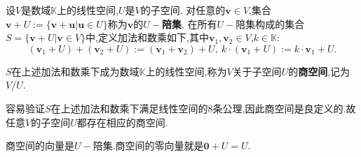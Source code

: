 \documentclass[../../main.tex]{subfiles}%
\begin{document}
\begin{definition}[$U-$陪集与商空间]\label{definition:U-陪集与商空间}
设\(V\)是数域\(\mathbb{K}\)上的线性空间,\(U\)是\(V\)的子空间. 对任意的\(\boldsymbol{v}\in V\),集合\(\boldsymbol{v}+U:=\{\boldsymbol{v}+\boldsymbol{u}|\boldsymbol{u}\in U\}\)称为\(\boldsymbol{v}\)的\textbf{\(U -\)陪集}. 在所有\(U -\)陪集构成的集合\(S = \{\boldsymbol{v}+U|\boldsymbol{v}\in V\}\)中,定义加法和数乘如下,其中\(\boldsymbol{v}_1,\boldsymbol{v}_2\in V\),\(k\in\mathbb{K}\):
\[
(\boldsymbol{v}_1 + U)+(\boldsymbol{v}_2 + U):=(\boldsymbol{v}_1+\boldsymbol{v}_2)+U,\ k\cdot(\boldsymbol{v}_1 + U):=k\cdot\boldsymbol{v}_1+U.
\]

\(S\)在上述加法和数乘下成为数域\(\mathbb{K}\)上的线性空间,称为\(V\)关于子空间\(U\)的\textbf{商空间},记为\(V/U\).
\end{definition}
\begin{note}
容易验证\(S\)在上述加法和数乘下满足线性空间的8条公理,因此商空间是良定义的.故任意$V$的子空间$U$都存在相应的商空间.
\end{note}
\begin{remark}
商空间的向量是$U-$陪集.商空间的零向量就是$\boldsymbol{0} + U=U$.
\end{remark}
\end{document}
